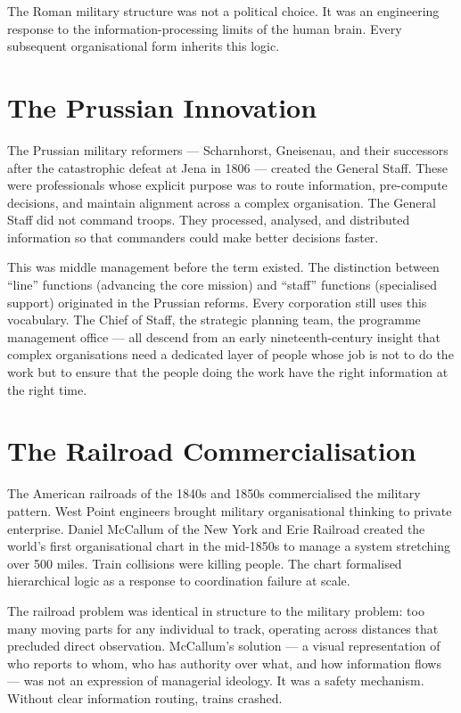 \begin{keyinsight}
The Roman military structure was not a political choice. It was an engineering response to the information-processing limits of the human brain. Every subsequent organisational form inherits this logic.
\end{keyinsight}

\section{The Prussian Innovation}

The Prussian military reformers --- Scharnhorst, Gneisenau, and their successors after the catastrophic defeat at Jena in 1806 --- created the General Staff. These were professionals whose explicit purpose was to route information, pre-compute decisions, and maintain alignment across a complex organisation. The General Staff did not command troops. They processed, analysed, and distributed information so that commanders could make better decisions faster.

This was middle management before the term existed. The distinction between ``line'' functions (advancing the core mission) and ``staff'' functions (specialised support) originated in the Prussian reforms. Every corporation still uses this vocabulary. The Chief of Staff, the strategic planning team, the programme management office --- all descend from an early nineteenth-century insight that complex organisations need a dedicated layer of people whose job is not to do the work but to ensure that the people doing the work have the right information at the right time.

\section{The Railroad Commercialisation}

The American railroads of the 1840s and 1850s commercialised the military pattern. West Point engineers brought military organisational thinking to private enterprise. Daniel McCallum of the New York and Erie Railroad created the world's first organisational chart in the mid-1850s to manage a system stretching over 500 miles. Train collisions were killing people. The chart formalised hierarchical logic as a response to coordination failure at scale.

The railroad problem was identical in structure to the military problem: too many moving parts for any individual to track, operating across distances that precluded direct observation. McCallum's solution --- a visual representation of who reports to whom, who has authority over what, and how information flows --- was not an expression of managerial ideology. It was a safety mechanism. Without clear information routing, trains crashed.

